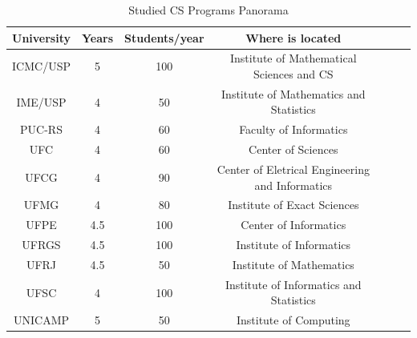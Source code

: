 \documentclass{beamer}
\begin{document}
\begin{frame}
\begin{table}
	\scriptsize
	\caption{Studied CS Programs Panorama}
    \begin{tabular}{|c|c|c|c|c|c|c|}
        \hline
        University   & Years & Students/year & Where is located                                   \\ \hline
        ICMC/USP     & 5     & 100   & Institute of Mathematical Sciences and CS        \\ 
        IME/USP      & 4     & 50    & Institute of Mathematics and Statistics          \\ 
        PUC-RS       & 4     & 60    & Faculty of Informatics                           \\ 
        UFC          & 4     & 60    & Center of Sciences                               \\ 
        UFCG         & 4     & 90    & Center of Eletrical Engineering and Informatics  \\ 
        UFMG         & 4     & 80    & Institute of Exact Sciences                      \\ 
        UFPE         & 4.5   & 100   & Center of Informatics                            \\ 
        UFRGS        & 4.5   & 100   & Institute of Informatics                         \\ 
        UFRJ         & 4.5   & 50    & Institute of Mathematics                         \\ 
        UFSC         & 4     & 100   & Institute of Informatics and Statistics          \\ 
        UNICAMP      & 5     & 50    & Institute of Computing                           \\
        \hline
    \end{tabular}
\end{table}
\end{frame}
\end{document}
